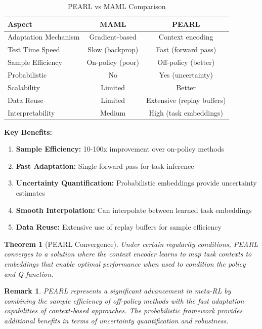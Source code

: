 \documentclass[12pt]{article}
\newcommand{\ieee}[1]{\textcolor{IEEEBlue}{\textbf{#1}}}
\newtheorem{theorem}{Theorem}
\newtheorem{remark}{Remark}
\begin{document}
{{			\begin{table}[H]
			\centering
			\caption{PEARL vs MAML Comparison}
			\begin{tabular}{@{}lcc@{}}
			\toprule
			\textbf{Aspect} & \textbf{MAML} & \textbf{PEARL} \\
			\midrule
			Adaptation Mechanism & Gradient-based & Context encoding \\
			Test Time Speed & Slow (backprop) & Fast (forward pass) \\
			Sample Efficiency & On-policy (poor) & Off-policy (better) \\
			Probabilistic & No & Yes (uncertainty) \\
			Scalability & Limited & Better \\
			Data Reuse & Limited & Extensive (replay buffers) \\
			Interpretability & Medium & High (task embeddings) \\
			\bottomrule
			\end{tabular}
			\label{tab:pearl_vs_maml}
			\end{table}
			
			\ieee{Key Benefits:}
			
			\begin{enumerate}
				\item \textbf{Sample Efficiency:} 10-100x improvement over on-policy methods
				\item \textbf{Fast Adaptation:} Single forward pass for task inference
				\item \textbf{Uncertainty Quantification:} Probabilistic embeddings provide uncertainty estimates
				\item \textbf{Smooth Interpolation:} Can interpolate between learned task embeddings
				\item \textbf{Data Reuse:} Extensive use of replay buffers for sample efficiency
			\end{enumerate}
			
			\begin{theorem}[PEARL Convergence]
			Under certain regularity conditions, PEARL converges to a solution where the context encoder learns to map task contexts to embeddings that enable optimal performance when used to condition the policy and Q-function.
			\end{theorem}
			
			\begin{remark}
			PEARL represents a significant advancement in meta-RL by combining the sample efficiency of off-policy methods with the fast adaptation capabilities of context-based approaches. The probabilistic framework provides additional benefits in terms of uncertainty quantification and robustness.
			\end{remark}
			
	}}
	
\end{document}
